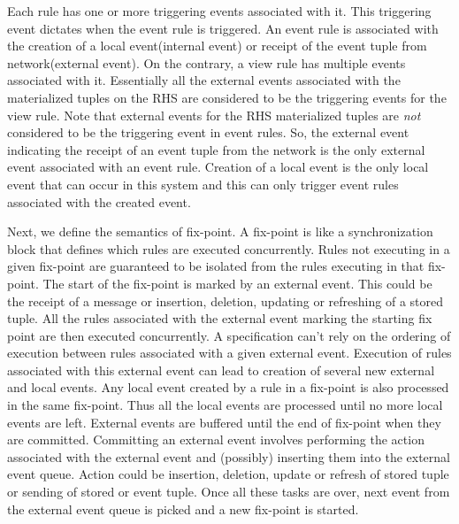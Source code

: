 Each rule has one or more triggering events associated with it. This triggering event dictates when the event rule is triggered. An event rule is associated with the creation of a local event(internal event) or receipt of the event tuple from network(external event). On the contrary, a view rule has multiple events associated with it. Essentially all the external events associated with the materialized tuples on the RHS are considered to be the triggering events for the view rule. Note that external events for the RHS materialized tuples are {\em not} considered to be the triggering event in event rules. So, the external event indicating the receipt of an event tuple from the network is the only external event associated with an event rule. Creation of a local event is the only local event that can occur in this system and this can only trigger event rules associated with the created event.

Next, we define the semantics of fix-point. A fix-point is like a synchronization block that defines which rules are executed concurrently. Rules not executing in a given fix-point are guaranteed to be isolated from the rules executing in that fix-point. The start of the fix-point is marked by an external event. This could be the receipt of a message or insertion, deletion, updating or refreshing of a stored tuple. All the rules associated with the external event marking the starting fix point are then executed concurrently. A specification can't rely on the ordering of execution between rules associated with a given external event. Execution of rules associated with this external event can lead to creation of several new external and local events. Any local event created by a rule in a fix-point is also processed in the same fix-point. Thus all the local events are processed until no more local events are left. External events are buffered until the end of fix-point when they are committed. Committing an external event involves performing the action associated with the external event and (possibly) inserting them into the external event queue. Action could be insertion, deletion, update or refresh of stored tuple or sending of stored or event tuple. Once all these tasks are over, next event from the external event queue is picked and a new fix-point is started.

